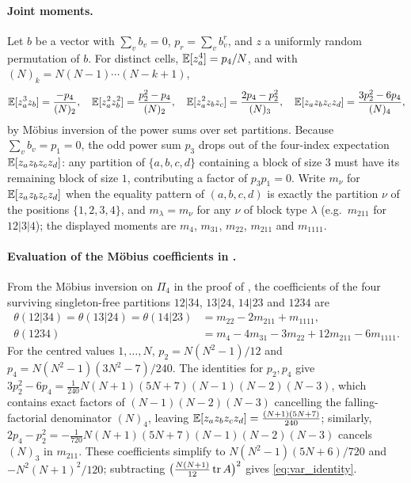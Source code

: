 \paragraph{Joint moments.}
Let $b$ be a vector with $\sum_vb_v=0$, $p_r=\sum_vb_v^r$, and $z$ a uniformly random permutation of $b$.
For distinct cells, $\mathbb{E}[z_a^4]=p_4/N$, and with $(N)_k=N(N-1)\cdots(N-k+1)$,
\[
\mathbb{E}[z_a^3z_b]=\frac{-p_4}{(N)_2},\quad \mathbb{E}[z_a^2z_b^2]=\frac{p_2^2-p_4}{(N)_2},\quad \mathbb{E}[z_a^2z_bz_c]=\frac{2p_4-p_2^2}{(N)_3},\quad \mathbb{E}[z_az_bz_cz_d]=\frac{3p_2^2-6p_4}{(N)_4},
\]
by M\"obius inversion of the power sums over set partitions.
Because $\sum_v b_v = p_1 = 0$, the odd power sum $p_3$ drops out of the four-index expectation $\mathbb{E}[z_a z_b z_c z_d]$: any partition of $\{a,b,c,d\}$ containing a block of size $3$ must have its remaining block of size $1$, contributing a factor of $p_3 p_1 = 0$.
Write $m_\nu$ for $\mathbb{E}[z_az_bz_cz_d]$ when the equality pattern of $(a,b,c,d)$ is exactly the partition $\nu$ of the positions $\{1,2,3,4\}$, and $m_\lambda=m_\nu$ for any $\nu$ of block type $\lambda$ (e.g.\ $m_{211}$ for $12|3|4$); the displayed moments are $m_4$, $m_{31}$, $m_{22}$, $m_{211}$ and $m_{1111}$.

\paragraph{Evaluation of the M\"obius coefficients in .}
From the M\"obius inversion on $\Pi_4$ in the proof of , the coefficients of the four surviving singleton-free partitions $12|34$, $13|24$, $14|23$ and $1234$ are
\[
\begin{aligned}\theta(12|34)=\theta(13|24)=\theta(14|23)&=m_{22}-2m_{211}+m_{1111},\\ \theta(1234)&=m_4-4m_{31}-3m_{22}+12m_{211}-6m_{1111}.\end{aligned}
\]
For the centred values $1,\dots,N$, $p_2=N(N^2-1)/12$ and $p_4=N(N^2-1)(3N^2-7)/240$.
The identities for $p_2, p_4$ give $3p_2^2 - 6p_4 = \frac{1}{240}N(N+1)(5N+7)(N-1)(N-2)(N-3)$, which contains exact factors of $(N-1)(N-2)(N-3)$ cancelling the falling-factorial denominator $(N)_4$, leaving $\mathbb{E}[z_a z_b z_c z_d] = \frac{(N+1)(5N+7)}{240}$; similarly, $2p_4 - p_2^2 = -\frac{1}{720}N(N+1)(5N+7)(N-1)(N-2)(N-3)$ cancels $(N)_3$ in $m_{211}$.
These coefficients simplify to $N(N^2-1)(5N+6)/720$ and $-N^2(N+1)^2/120$; subtracting $\bigl(\frac{N(N+1)}{12}\operatorname{tr} A\bigr)^2$ gives \eqref{eq:var_identity}.

